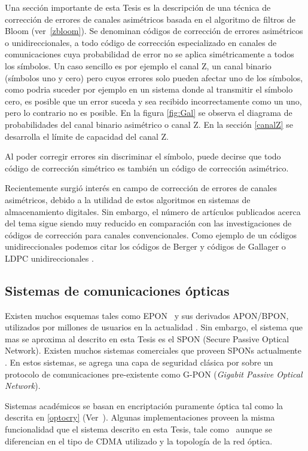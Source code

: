 Una sección importante de esta Tesis es la descripción de una técnica de corrección de errores de canales asimétricos basada en el algoritmo de filtros de Bloom (ver~\ref{zbloom}). 
Se denominan códigos de corrección de errores asimétricos o unidireccionales, a todo código de corrección especializado en canales de comunicaciones cuya probabilidad de error no se aplica simétricamente a todos los símbolos. Un caso sencillo es por ejemplo el canal Z, un canal binario (símbolos uno y cero) pero cuyos errores solo pueden afectar uno de los símbolos, como podria suceder por ejemplo en un sistema donde al transmitir el símbolo cero, es posible que un error suceda y sea recibido incorrectamente como un uno, pero lo contrario no es posible. En la figura \ref{fig:Gal} se observa el diagrama de probabilidades del canal binario asimétrico o canal Z. En la sección \ref{canalZ} se desarrolla el límite de capacidad del canal Z.

 Al poder corregir errores sin discriminar el símbolo, puede decirse que todo código de corrección simétrico es también un código de corrección asimétrico.

Recientemente surgió interés en campo de corrección de errores de canales asimétricos, debido a la utilidad de estos algoritmos en sistemas de almacenamiento digitales\cite{tanakamaru201195}. Sin embargo, el número de artículos publicados acerca del tema sigue siendo muy reducido en comparación con las investigaciones de códigos de corrección para canales convencionales. Como ejemplo de un códigos unidireccionales podemos citar los códigos de Berger \cite{berger1961note} y códigos de Gallager o LDPC unidireccionales \cite{neri2008gallager}.

\subsection{Sistemas de comunicaciones ópticas}
\label{defPON}
Existen muchos esquemas tales como EPON~\cite{kramer2002ethernet} y sus derivados APON/BPON, utilizados por millones de usuarios en la actualidad \cite{chanclou2013france}.
Sin embargo, el sistema que mas se aproxima al descrito en esta Tesis es el SPON (Secure Passive Optical Network). Existen muchos sistemas comerciales que proveen SPONs actualmente \cite{armoredshield}. En estos sistemas, se agrega una capa de seguridad clásica por sobre un protocolo de comunicaciones pre-existente como G-PON (\textit{Gigabit Passive Optical Network}).

Sistemas académicos se basan en encriptación puramente óptica tal como la descrita en \ref{optocry} (Ver~\cite{cincotti2009secure}). Algunas implementaciones proveen la misma funcionalidad que el sistema descrito en esta Tesis, tale como~\cite{nadarajah2006implementation} aunque se diferencian en el tipo de CDMA utilizado y la topología de la red óptica.

